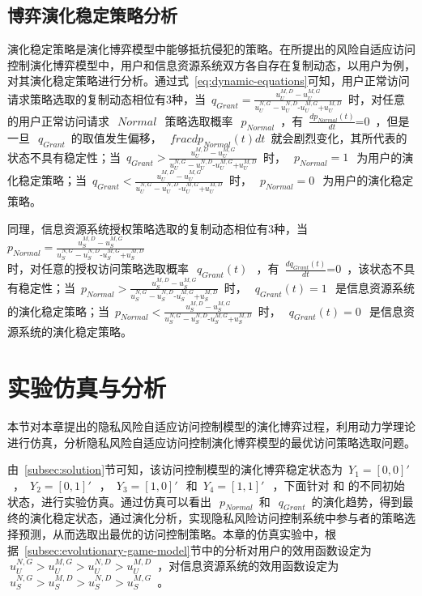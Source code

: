 \subsection{博弈演化稳定策略分析}
演化稳定策略是演化博弈模型中能够抵抗侵犯的策略。在所提出的风险自适应访问控制演化博弈模型中，用户和信息资源系统双方各自存在复制动态，以用户为例，对其演化稳定策略进行分析。通过式~\ref{eq:dynamic-equations}可知，用户正常访问请求策略选取的复制动态相位有3种，当~${{q}_{Grant}}=\frac{u_{U}^{M,D}-u_{U}^{M,G}}{u_{U}^{N,G}-u_{U}^{N,D}\text{-}u_{U}^{M,G}\text{+}u_{U}^{M,D}}$~时，对任意的用户正常访问请求~$~Normal~$~策略选取概率~$~p_{Normal}$~，有~$\frac{d{{p}_{Normal}}(t)}{dt}\text{=0}$~，但是一旦~$~q_{Grant}$~的取值发生偏移，~$~frac{d{{p}_{Normal}}(t)}{dt}$~就会剧烈变化，其所代表的状态不具有稳定性；当~${{q}_{Grant}}>\frac{u_{U}^{M,D}-u_{U}^{M,G}}{u_{U}^{N,G}-u_{U}^{N,D}\text{-}u_{U}^{M,G}\text{+}u_{U}^{M,D}}$~时，~$~p_{Normal}= 1~$~为用户的演化稳定策略；当~${{q}_{Grant}}<\frac{u_{U}^{M,D}-u_{U}^{M,G}}{u_{U}^{N,G}-u_{U}^{N,D}\text{-}u_{U}^{M,G}\text{+}u_{U}^{M,D}}$~时，~$~p_{Normal}=0~$~为用户的演化稳定策略。

 同理，信息资源系统授权策略选取的复制动态相位有3种，当~${{p}_{Normal}}=\frac{u_{S}^{M,D}-u_{S}^{M,G}}{u_{S}^{N,G}-u_{S}^{N,D}\text{-}u_{S}^{M,G}\text{+}u_{S}^{M,D}}$\\时，对任意的授权访问策略选取概率~$~q_{Grant}(t)~$~，有~$\frac{d{{q}_{Grant}}(t)}{dt}\text{=0}$~，该状态不具有稳定性；当~${{p}_{Normal}}>\frac{u_{S}^{M,D}-u_{S}^{M,G}}{u_{S}^{N,G}-u_{S}^{N,D}\text{-}u_{S}^{M,G}\text{+}u_{S}^{M,D}}$~时，~$~q_{Grant}(t)=1~$~是信息资源系统的演化稳定策略；当~${{p}_{Normal}}<\frac{u_{S}^{M,D}-u_{S}^{M,G}}{u_{S}^{N,G}-u_{S}^{N,D}\text{-}u_{S}^{M,G}\text{+}u_{S}^{M,D}}$~时，~$~q_{Grant}(t)=0~$~是信息资源系统的演化稳定策略。
 
 
 \section{实验仿真与分析}
本节对本章提出的隐私风险自适应访问控制模型的演化博弈过程，利用动力学理论进行仿真，分析隐私风险自适应访问控制演化博弈模型的最优访问策略选取问题。

 由~\ref{subsec:solution}节可知，该访问控制模型的演化博弈稳定状态为~${{Y}_{1}}=[0,0]'~$~，~${{Y}_{2}}=[0,1]'~$~，~${{Y}_{3}}=[1,0]'~$~和~${{Y}_{4}}=[1,1]'~$~，下面针对 和 的不同初始状态，进行实验仿真。通过仿真可以看出~$~p_{Normal}$~和~$~q_{Grant}$~的演化趋势，得到最终的演化稳定状态，通过演化分析，实现隐私风险访问控制系统中参与者的策略选择预测，从而选取出最优的访问控制策略。本章的仿真实验中，根据~\ref{subsec:evolutionary-game-model}节中的分析对用户的效用函数设定为~$~u_{U}^{N,G}>u_{U}^{M,G}>u_{U}^{N,D}>u_{U}^{M,D}$~，对信息资源系统的效用函数设定为~$~u_{S}^{N,G}>u_{S}^{M,D}>u_{S}^{N,D}>u_{S}^{M,G}$~。

